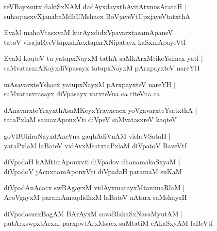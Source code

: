 \documentclass[twoside,12pt,openright]{book}
\newcounter{shloka}[chapter]
\begin{document}
\begin{shloka}%
teVBayxsutx dakiSxNAM dadAyxdayxthAvitAtxnusArataH |\\
suhaqtasxvXjanabaMdhUMshacx BoVjayeVtUpxjayeVtatxthA
\end{shloka}

\begin{shloka}%
EvaM mahoVtasxvaM kurAyxdidxVpavarxtasamApaneV |\\
tatoV visajaRyeVtapxshAcxtapxrXNipatayx kaSxmApayeVtf 
\end{shloka}

\begin{shloka}%
EvaM kaqteV tu yatupxNayxM tathA saMkArxMtikeYshacx yatf |\\
saMvatasxrAKayxdiVpasayx tatupxNayxM pArxpayxteV nareYH 
\end{shloka}

\begin{shloka}%
mAsavarxteYshacx yatupxNayxM pArxpayxteV nareYH |\\
saMvatasxrasayx diVpasayx varxteVna ca riteVna ca 
\end{shloka}

\begin{shloka}%
dAnavarxteYrayxthAsaMKeyxYrayxcacx yoVgavarxteYsatxthA |\\
tataPxlaM samavAponxVti diVpeV saMvatasxreV kaqteV 
\end{shloka}

\begin{shloka}%
goVBUhiraNayxdAneVna gaqhAdiVnAM visheVSataH |\\
yataPxlaM laBateV vidAvxMsatxtaPxlaM diVpatoV BaveVtf
\end{shloka}

\begin{shloka}%
diVpadaH kAMtimAponxvti diVpadov dhanamakaSxyaM |\\
diVpadoV jAcnxnamAponxVti diVpadaH paramaM suKaM 
\end{shloka}

\begin{shloka}%
diVpadAnAcacx swBAgayxM vidAyxmatayxMtanimaRlaM |\\
AroVgayxM paramAmaqdidhxM laBateV nAtarx saMshayaH
\end{shloka}

\begin{shloka}%
diVpadasusxBagAM BArAyxM savaRlakaSxNasaMyutAM |\\
putArxswpxtArxnf parxpwtArxMsacx saMtatiM cAkaSxyAM laBeVtf
\end{shloka}
\end{document}
